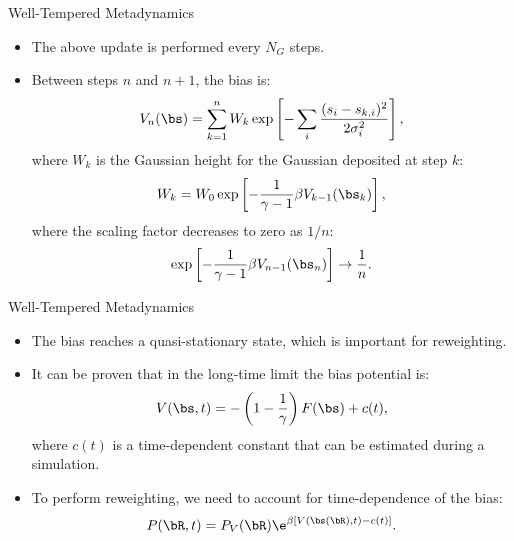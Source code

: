 \documentclass[10pt]{beamer}
\begin{document}
\begin{frame}{Well-Tempered Metadynamics}
\begin{itemize}
\setlength\itemsep{1em}
  \item The above update is performed every $N_G$ steps.

  \item Between steps $n$ and $n+1$, the bias is:
  \begin{equation}
    V_n(\bs) = \sum_{k=1}^n W_k \exp\left[ -\sum_i \frac{(s_i-s_{k,i})^2}{2\sigma^2_i} \right],
  \end{equation}
  where $W_k$ is the Gaussian height for the Gaussian deposited at step $k$:
  \begin{equation}
    W_k=W_0\exp\left[ -\frac{1}{\gamma-1} \beta V_{k-1}(\bs_k) \right],
  \end{equation}
  where the scaling factor decreases to zero as $1/n$:
  \begin{equation}
    \exp\left[ -\frac{1}{\gamma-1} \beta V_{n-1}(\bs_n) \right] \to \frac{1}{n}.
  \end{equation}
\end{itemize}
\end{frame}

\begin{frame}{Well-Tempered Metadynamics}
\begin{itemize}
\setlength\itemsep{1em}
  \item The bias reaches a quasi-stationary state, which is important for reweighting.

  \item It can be proven that in the long-time limit the bias potential is:
  \begin{equation}
    V(\bs,t)=-\left( 1-\frac{1}{\gamma} \right) F(\bs) + c(t),
  \end{equation}
  where $c(t)$ is a time-dependent constant that can be estimated during a simulation.

  \item To perform reweighting, we need to account for time-dependence of the bias:
  \begin{equation}
    P(\bR,t) = P_V(\bR)\e^{\beta [V(\bs(\bR),t)-c(t)]}.
  \end{equation}
\end{itemize}
\end{frame}
\end{document}
